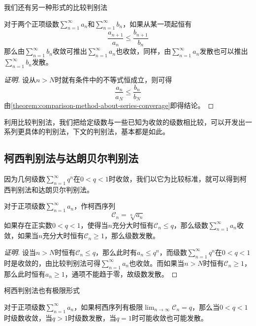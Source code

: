 我们还有另一种形式的比较判别法
\begin{theorem}
  对于两个正项级数$\sum_{n=1}^{\infty}a_n$和$\sum_{n=1}^{\infty}b_n$，如果从某一项起恒有
  \[ \frac{a_{n+1}}{a_n} \leqslant \frac{b_{n+1}}{b_n} \]
  那么由$\sum_{n=1}^{\infty}b_n$收敛可推出$\sum_{n=1}^{\infty}a_n$也收敛，同样，由$\sum_{n=1}^{\infty}a_n$发散也可以推出$\sum_{n=1}^{\infty}b_n$发散。
\end{theorem}

\begin{proof}[证明]
  设从$n>N$时就有条件中的不等式恒成立，则可得
  \[ \frac{a_n}{a_N} \leqslant \frac{b_n}{b_N} \]
  由\autoref{theorem:comparison-method-about-series-converage}即得结论。
\end{proof}

利用比较判别法，我们把给定级数与一些已知为收敛的级数相比较，可以开发出一系列更具体的判别法，下文的判别法，基本都是如此。

\subsection{柯西判别法与达朗贝尔判别法}
\label{sec:cauchy-dalembert-method-aboud-series-converage}

因为几何级数$\sum_{n=1}^{\infty}q^n$在$0<q<1$时收敛，我们以它为比较标准，就可以得到柯西判别法和达朗贝尔判别法。

\begin{theorem}[柯西判别法]
  对于正项级数$\sum_{n=1}^{\infty}a_n$，作柯西序列
  \[ \mathcal{C}_n = \sqrt[n]{a_n} \]
  如果存在正实数$0<q<1$，使得当$n$充分大时恒有$\mathcal{C}_n \leqslant q$，那么级数$\sum_{n=1}^{\infty}a_n$收敛，如果当$n$充分大时恒有$\mathcal{C}_n \geqslant 1$，那么级数发散。
\end{theorem}

\begin{proof}[证明]
  设当$n>N$时恒有$\mathcal{C}_n \leqslant q$，那么此时有$a_n \leqslant q^n$，而级数$\sum_{n=1}^{\infty}q^n$在$0<q<1$时是收敛的，由比较判别法可得$\sum_{n=1}^{\infty}a_n$也收敛。而如果当$n>N$时恒有$\mathcal{C}_n \geqslant 1$，那么此时恒有$a_n \geqslant 1$，通项不能趋于零，故级数发散。
\end{proof}

柯西判别法也有极限形式
\begin{inference}
  对于正项级数$\sum_{n=1}^{\infty}a_n$，如果柯西序列有极限$\lim_{n \to \infty} \mathcal{C}_n=q$，那么当$0<q<1$时级数收敛，当$q>1$时级数发散，当$q=1$时可能收敛也可能发散。
\end{inference}

